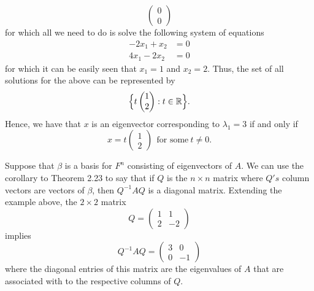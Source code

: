 \begin{eg}
\[\begin{pmatrix}
                                                                   0 \\
                                                                   0
                                                                  \end{pmatrix} \]
            for which all we need to do is solve the following system of equations
            \begin{align*}
                {-2x}_{1} + {x}_{2} &= 0  \\
                {4x}_{1} - {2x}_{2} &= 0 
            \end{align*}
            for which it can be easily seen that \( {x}_{1} = 1  \) and \( {x}_{2} = 2  \). Thus, the set of all solutions for the above can be represented by
            \[  \Big\{ t \begin{pmatrix} 
                       1 \\
                       2 
                      \end{pmatrix} : t \in \mathbb{R} \Big\}. \]
        Hence, we have that \( x  \) is an eigenvector corresponding to \( {\lambda}_{1} = 3  \) if and only if
        \[  x = t \begin{pmatrix} 
                   1 \\
                   2 
               \end{pmatrix} \ \ \text{for some} \  t \neq 0. \]
\end{eg}

Suppose that \( \beta  \) is a basis for \( F^{n} \) consisting of eigenvectors of \( A  \). We can use the corollary to Theorem 2.23 to say that if \( Q \) is the \( n \times n  \) matrix where \( Q's \) column vectors are vectors of \( \beta \), then \(Q^{-1} A Q    \) is a diagonal matrix. Extending the example above, the \( 2 \times 2  \) matrix
\[  Q = \begin{pmatrix} 
    1 & 1 \\
    2 & -2 
          \end{pmatrix} \]
     implies            
     \[  Q^{-1}A Q = \begin{pmatrix} 
         3 & 0 \\
         0 & -1 
               \end{pmatrix} \]
               where the diagonal entries of this matrix are the eigenvalues of \( A  \) that are associated with to the respective columns of \( Q  \).

